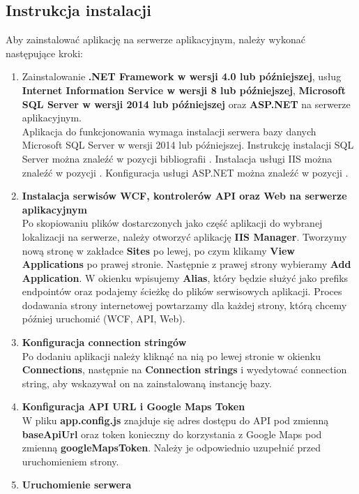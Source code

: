 \documentclass[10pt,a4paper]{article}
\begin{document}
\subsection{Instrukcja instalacji}
Aby zainstalować aplikację na serwerze aplikacyjnym, należy wykonać następujące kroki:
\begin{enumerate}
	\item Zainstalowanie \textbf{.NET Framework w wersji 4.0 lub późniejszej}, usług \textbf{Internet Information Service w wersji 8 lub późniejszej}, \textbf{Microsoft SQL Server w wersji 2014 lub późniejszej} oraz \textbf{ASP.NET} na serwerze aplikacyjnym. \\
	Aplikacja do funkcjonowania wymaga instalacji serwera bazy danych Microsoft SQL Server w wersji 2014 lub późniejszej. Instrukcję instalacji SQL Server można znaleźć w pozycji bibliografii \cite{sqlserver}. Instalacja usługi IIS można znaleźć w pozycji \cite{iis}. Konfiguracja usługi ASP.NET można znaleźć w pozycji \cite{aspnet}.
	\item \textbf{Instalacja serwisów WCF, kontrolerów API oraz Web na serwerze aplikacyjnym} \\
	Po skopiowaniu plików dostarczonych jako część aplikacji do wybranej lokalizacji na serwerze, należy otworzyć aplikację \textbf{IIS Manager}. Tworzymy nową stronę w zakładce \textbf{Sites} po lewej, po czym klikamy \textbf{View Applications} po prawej stronie. Następnie z prawej strony wybieramy \textbf{Add Application}. W okienku wpisujemy \textbf{Alias}, który będzie służyć jako prefiks endpointów oraz podajemy ścieżkę do plików serwisowych aplikacji. Proces dodawania strony internetowej powtarzamy dla każdej strony, którą chcemy później uruchomić (WCF, API, Web).
	\item \textbf{Konfiguracja connection stringów} \\
	Po dodaniu aplikacji należy kliknąć na nią po lewej stronie w okienku \textbf{Connections}, następnie na \textbf{Connection strings} i wyedytować connection string, aby wskazywał on na zainstalowaną instancję bazy.
	\item \textbf{Konfiguracja API URL i Google Maps Token} \\
	W pliku \textbf{app.config.js} znajduje się adres dostępu do API pod zmienną \textbf{baseApiUrl} oraz token konieczny do korzystania z Google Maps pod zmienną \textbf{googleMapsToken}. Należy je odpowiednio uzupełnić przed uruchomieniem strony.
	\item \textbf{Uruchomienie serwera} \\

\end{enumerate}
\end{document}
